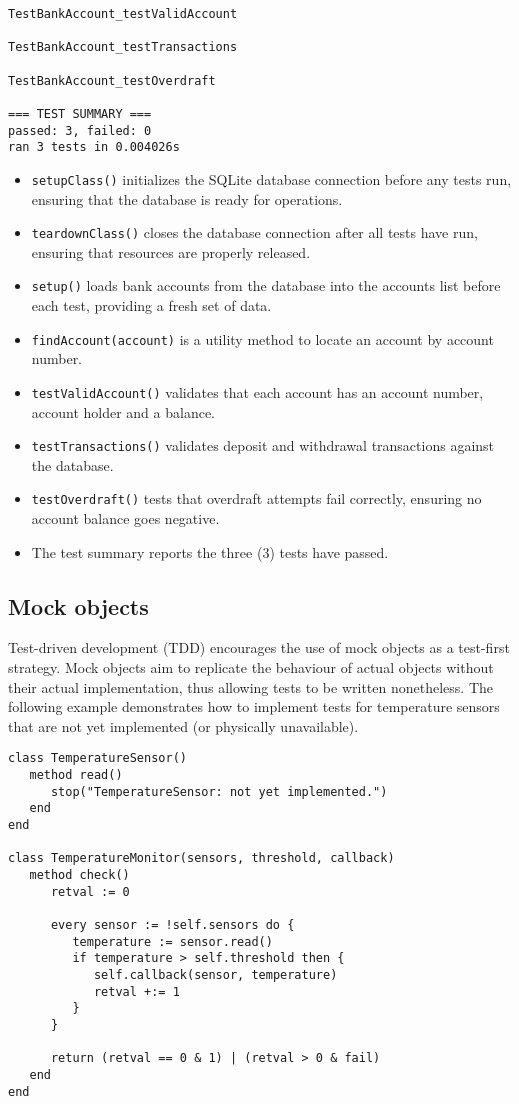 \documentclass[letterpaper,12pt]{article}
\begin{document}
\bigskip{}
\begin{verbatim}
TestBankAccount_testValidAccount

TestBankAccount_testTransactions

TestBankAccount_testOverdraft

=== TEST SUMMARY ===
passed: 3, failed: 0
ran 3 tests in 0.004026s
\end{verbatim}

\newpage{}
\begin{itemize}
   \item \texttt{setupClass()} initializes the SQLite database connection before any tests run, ensuring that the database is ready for operations.
   \item \texttt{teardownClass()} closes the database connection after all tests have run, ensuring that resources are properly released.
   \item \texttt{setup()} loads bank accounts from the database into the accounts list before each test, providing a fresh set of data.
   \item \texttt{findAccount(account)} is a utility method to locate an account by account number.
   \item \texttt{testValidAccount()} validates that each account has an account number, account holder and a balance.
   \item \texttt{testTransactions()} validates deposit and withdrawal transactions against the database.
   \item \texttt{testOverdraft()} tests that overdraft attempts fail correctly, ensuring no account balance goes negative.
   \item The test summary reports the three (3) tests have passed.
\end{itemize}

\newpage\subsection{Mock objects}

Test-driven development (TDD) encourages the use of mock objects as a test-first strategy. Mock objects aim to replicate the behaviour of actual objects without their actual implementation, thus allowing tests to be written nonetheless. The following example demonstrates how to implement tests for temperature sensors that are not yet implemented (or physically unavailable).

\bigskip{}
\begin{verbatim}
class TemperatureSensor()
   method read()
      stop("TemperatureSensor: not yet implemented.")
   end
end

class TemperatureMonitor(sensors, threshold, callback)
   method check()
      retval := 0
      
      every sensor := !self.sensors do {
         temperature := sensor.read()
         if temperature > self.threshold then {
            self.callback(sensor, temperature)
            retval +:= 1
         }
      }

      return (retval == 0 & 1) | (retval > 0 & fail)
   end
end
\end{verbatim}
\end{document}
